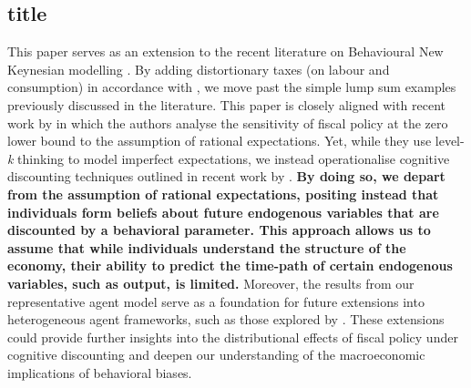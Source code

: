 \documentclass[11pt]{article}
\newcommand{\bb}{\bigbreak\noindent}
\begin{document}
\begin{spacing}{2}
\subsection{title}
This paper serves as an extension to the recent literature on Behavioural New Keynesian modelling \parencite{gabaix2020behavioural, lubik2021fiscal}. By adding distortionary taxes (on labour and consumption) in accordance with \cite{correia2013unconventional}, we move past the simple lump sum examples previously discussed in the literature. 
\bb
This paper is closely aligned with recent work by \cite{bianchi2024fiscal} in which the authors analyse the sensitivity of fiscal policy at the zero lower bound to the assumption of rational expectations. Yet, while they use level-\textit{k} thinking to model imperfect expectations, we instead operationalise cognitive discounting techniques outlined in recent work by \cite{gabaix2020behavioural}. \textbf{By doing so, we depart from the assumption of rational expectations, positing instead that individuals form beliefs about future endogenous variables that are discounted by a behavioral parameter. This approach allows us to assume that while individuals understand the structure of the economy, their ability to predict the time-path of certain endogenous variables, such as output, is limited. }
\bb
Moreover, the results from our representative agent model serve as a foundation for future extensions into heterogeneous agent frameworks, such as those explored by \parencite{pfauti2022behavioral}. These extensions could provide further insights into the distributional effects of fiscal policy under cognitive discounting and deepen our understanding of the macroeconomic implications of behavioral biases.



\end{spacing}
\end{document}
